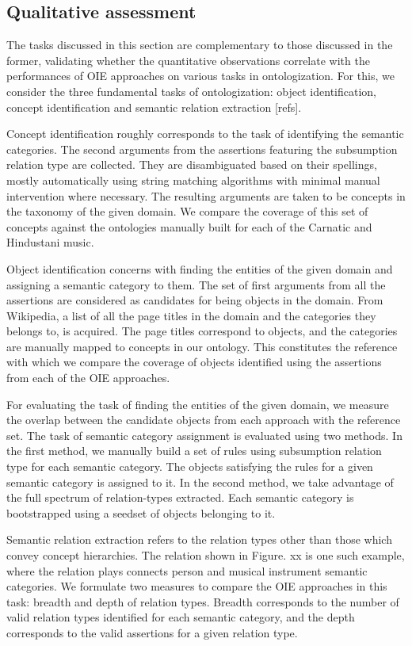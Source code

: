 \documentclass{llncs}
\begin{document}
\subsection{Qualitative assessment}
The tasks discussed in this section are complementary to those discussed in the former, validating whether the quantitative observations correlate with the performances of OIE approaches on various tasks in ontologization. For this, we consider the three fundamental tasks of ontologization: object identification, concept identification and semantic relation extraction [refs]. 

Concept identification roughly corresponds to the task of identifying the semantic categories. The second arguments from the assertions featuring the subsumption relation type are collected. They are disambiguated based on their spellings, mostly automatically using string matching algorithms with minimal manual intervention where necessary. The resulting arguments are taken to be concepts in the taxonomy of the given domain. We compare the coverage of this set of concepts against the ontologies manually built for each of the Carnatic and Hindustani music.

Object identification concerns with finding the entities of the given domain and assigning a semantic category to them. The set of first arguments from all the assertions are considered as candidates for being objects in the domain. From Wikipedia, a list of all the page titles in the domain and the categories they belongs to, is acquired.  The page titles correspond to objects, and the categories are manually mapped to concepts in our ontology. This constitutes the reference with which we compare the coverage of objects identified using the assertions from each of the OIE approaches. 

For evaluating the task of finding the entities of the given domain, we measure the overlap between the candidate objects from each approach with the reference set. The task of semantic category assignment is evaluated using two methods. In the first method, we manually build a set of rules using subsumption relation type for each semantic category. The objects satisfying the rules for a given semantic category is assigned to it. In the second method, we take advantage of the full spectrum of relation-types extracted. Each semantic category is bootstrapped using a seedset of objects belonging to it.

Semantic relation extraction refers to the relation types other than those which convey concept hierarchies. The relation shown in Figure. xx is one such example, where the relation plays connects person and musical instrument semantic categories. We formulate two measures  to compare the OIE approaches in this task: breadth and depth of relation types. Breadth corresponds to the number of valid relation types identified for each semantic category, and the depth corresponds to the valid assertions for a given relation type.
\end{document}

